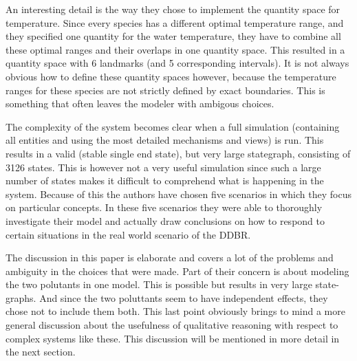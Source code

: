 \documentclass{article} %
\begin{document}
An interesting detail is the way they chose to implement the quantity space for
temperature. Since every species has a different optimal temperature range, and
they specified one quantity for the water temperature, they have to combine all
these optimal ranges and their overlaps in one quantity space. This resulted in
a quantity space with 6 landmarks (and 5 corresponding intervals). It is not
always obvious how to define these quantity spaces however, because the
temperature ranges for these species are not strictly defined by exact
boundaries. This is something that often leaves the modeler with ambigous
choices.

\vspace{0.8 em}

The complexity of the system becomes clear when a full simulation (containing
all entities and using the most detailed mechanisms and views) is run. This
results in a valid (stable single end state), but very large stategraph,
consisting of 3126 states. This is however not a very useful simulation since
such a large number of states makes it difficult to comprehend what is
happening in the system. Because of this the authors have chosen five scenarios
in which they focus on particular concepts. In these five scenarios they were
able to thoroughly investigate their model and actually draw conclusions on how
to respond to certain situations in the real world scenario of the DDBR.

\vspace{0.8em}

The discussion in this paper is elaborate and covers a lot of the problems and
ambiguity in the choices that were made. Part of their concern is about modeling
the two polutants in one model. This is possible but results in very large
state-graphs. And since the two poluttants seem to have independent effects,
they chose not to include them both.
This last point obviously brings to mind a more general discussion about the
usefulness of qualitative reasoning with respect to complex systems like these.
This discussion will be mentioned in more detail in the next section.
\end{document}
